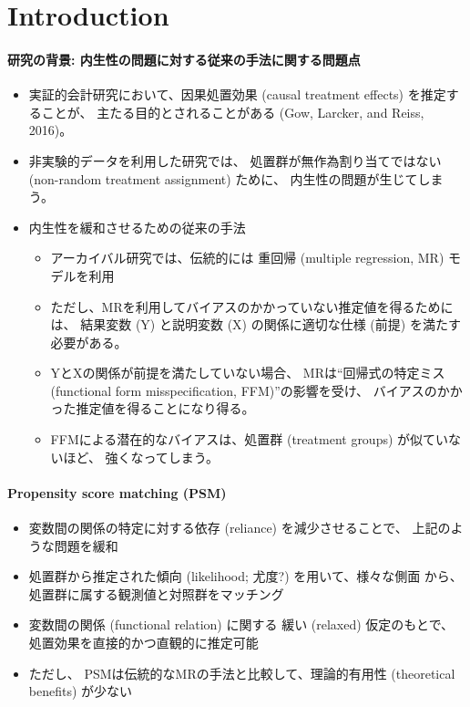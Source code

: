 \section{Introduction}

\paragraph{研究の背景: 内生性の問題に対する従来の手法に関する問題点}
\begin{itemize}
 \item 実証的会計研究において、因果処置効果 (causal treatment effects) を推定することが、
       主たる目的とされることがある (Gow, Larcker, and Reiss, 2016)。
 \item 非実験的データを利用した研究では、
       処置群が無作為割り当てではない (non-random treatment assignment) ために、
       内生性の問題が生じてしまう。
 \item 内生性を緩和させるための従来の手法
       \begin{itemize}
        \item アーカイバル研究では、伝統的には
              重回帰 (multiple regression, MR) モデルを利用
        \item ただし、MRを利用してバイアスのかかっていない推定値を得るためには、
              結果変数 (Y) と説明変数 (X) の関係に適切な仕様 (前提) を満たす必要がある。
        \item YとXの関係が前提を満たしていない場合、
              MRは``回帰式の特定ミス (functional form misspecification, FFM)''の影響を受け、
              バイアスのかかった推定値を得ることになり得る。
        \item FFMによる潜在的なバイアスは、処置群 (treatment groups) が似ていないほど、
              強くなってしまう。
       \end{itemize}
\end{itemize}

\paragraph{Propensity score matching (PSM)}
\begin{itemize}
 \item 変数間の関係の特定に対する依存 (reliance) を減少させることで、
       上記のような問題を緩和
 \item 処置群から推定された傾向 (likelihood; 尤度?) を用いて、様々な側面
       から、処置群に属する観測値と対照群をマッチング
 \item 変数間の関係 (functional relation) に関する
       緩い (relaxed) 仮定のもとで、処置効果を直接的かつ直観的に推定可能
 \item ただし、
       PSMは伝統的なMRの手法と比較して、理論的有用性 (theoretical
       benefits) が少ない
\end{itemize}

